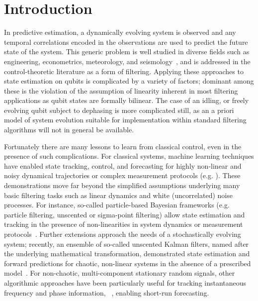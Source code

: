 \section{Introduction} 

In predictive estimation, a dynamically evolving system is observed and any temporal correlations encoded in the observations are used to predict the future state of the system.  This generic problem is well studied in diverse fields such as engineering, econometrics, meteorology, and seismology~\cite{groen2013real,dong2009unscented,ko2009gp,harvey1990forecasting,cheng2015time}, and is addressed in the control-theoretic literature as a form of filtering.  Applying these approaches to state estimation on qubits is complicated by a variety of factors; dominant among these is the violation of the assumption of linearity inherent in most filtering applications as qubit states are formally bilinear. The case of an idling, or freely evolving qubit subject to dephasing is more complicated still, as an a priori model of system evolution suitable for implementation within standard filtering algorithms will not in general be available.

Fortunately there are many lessons to learn from classical control, even in the presence of such complications.  For classical systems, machine learning techniques have enabled state tracking, control, and forecasting for highly non-linear and noisy dynamical trajectories or complex measurement protocols (e.g. \cite{garcia2016optimal, bach2004learning, tatinati2013hybrid, hall2011reinforcement, hamilton2016ensemble}). These demonstrations move far beyond the simplified assumptions underlying many basic filtering tasks such as linear dynamics and white (uncorrelated) noise processes. For instance, so-called particle-based Bayesian frameworks (e.g. particle filtering, unscented or sigma-point filtering) allow state estimation and tracking in the presence of non-linearities in system dynamics or measurement protocols~\cite{candy2016bayesian}.  Further extensions approach the needs of a stochastically evolving system; recently, an ensemble of so-called unscented Kalman filters, named after the underlying mathematical transformation, demonstrated state estimation and forward predictions for chaotic, non-linear systems in the absence of a prescribed model~\cite{hamilton2016ensemble}. For non-chaotic, multi-component stationary random signals, other algorithmic approaches have been particularly useful for tracking instantaneous frequency and phase information, ~\cite{boashash1992estimating2, ji2016gradient}, enabling short-run forecasting.  

